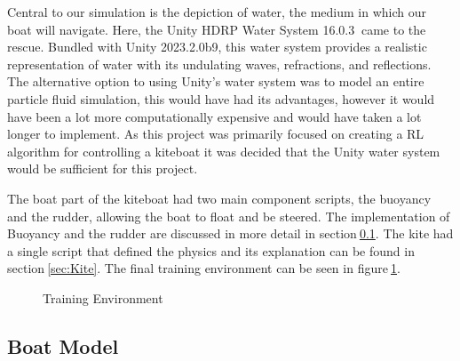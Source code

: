 Central to our simulation is the depiction of water, the medium in which our boat will navigate. Here, the Unity HDRP Water System 16.0.3$~$\cite{UnityHDRPWaterSystem} came to the rescue. Bundled with Unity 2023.2.0b9, this water system provides a realistic representation of water with its undulating waves, refractions, and reflections. 
The alternative option to using Unity's water system was to model an entire particle fluid simulation, this would have had its advantages, however it would have been a lot more computationally expensive and would have taken a lot longer to implement. As this project was primarily focused on creating a RL algorithm for controlling a kiteboat it was decided that the Unity water system would be sufficient for this project.  

The boat part of the kiteboat had two main component scripts, the buoyancy and the rudder, allowing the boat to float and be steered. The implementation of Buoyancy and the rudder are discussed in more detail in section$~$\ref{sec:Boat}. The kite had a single script that defined the physics and its explanation can be found in section$~$\ref{sec:Kite}. The final training environment can be seen in figure$~$\ref{training_enviroment}.

\begin{figure}[h]
    \centering
    \caption{Training Environment}\label{training_enviroment}
\end{figure}


\subsection{Boat Model}\label{sec:Boat}

